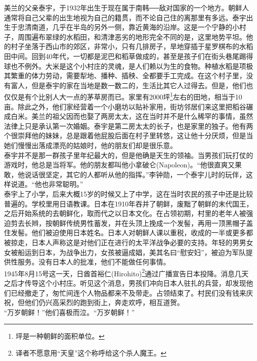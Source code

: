 \begin{multicols}{\theparacolNo}
美兰的父亲泰宇，于1932年出生于现在属于南韩──敌对国家的一个地方。朝鲜人通常将自己父辈的出生地视为自己的籍贯，而不论自己住的离那里有多远。泰宇出生于忠清南道，几乎在半岛的另外一侧，靠近黄海的沿岸。这是一个宁静的小村子，周围遍布翠绿的水稻田，和清津恶劣的地形完全不同的是，这里地势平坦。他的村子坐落于西山市的郊区，非常小，只有几排房子，旱地穿插于星罗棋布的水稻田中间。回到40年代，一切都是泥巴和稻草做成的，甚至是孩子们在街头巷尾踢得球也不例外。大米是这个小村庄的灵魂，是人们赖以为生的食物。种植水稻是项极其繁重的体力劳动，需要犁地、播种、插秧、全都要手工完成。在这个村子里，没有富人，但是泰宇的家在当地是数一数二的，生活比其它人过得去。但是，他们也仅仅是有个比别人大一点的茅草房而已。家里有2000坪\footnote{坪是一种朝鲜的面积单位。}左右的田地，相当于10亩。除此之外，他们家经营着一个小磨坊以贴补家用，街坊邻居们来这里把稻谷碾成白米。美兰的祖父因而也娶了两房太太，这在当时并不是什么稀罕的事情，虽然法律上只是承认第一次婚姻。泰宇是第二房太太的长子，也是家里的独子。他有两个很崇拜他的妹妹，总是跟着他屁股后面在村子里转悠，这让他十分厌烦，但是当她们慢慢出落成漂亮的姑娘时，他的朋友们却是很乐意。\\

泰宇并不是那一群孩子里年纪最大的，但是他确是天生的领袖。当男孩们玩打仗的游戏时，他总是当将军。他的朋友都叫他小拿破仑(Napoleon)。“他很直爽又果敢，他说话很坚定，其它的人都听从他的指挥。”李钟勋，一个泰宇儿时的玩伴，这样说道。“他也非常聪明。”\\

泰宇上了小学，后来大概15岁的时候又上了中学，这在当时农民的孩子中还是比较普遍的。学校里用日语教课。日本在1910年吞并了朝鲜，废黜了朝鲜的末代国王，之后开始系统的去朝鲜化，取而代之以日本文化。在占领初期，村里的老年人被强迫剪去长辫，按朝鲜传统男性蓄发，并在头顶上挽成一个发髻，再用一顶黑帽子盖住发髻。他们被迫使用日本姓名。日本人对朝鲜人课以重税，收成的一半或更多都被掠走，日本人声称这是对他们正在进行的太平洋战争必要的支持。年轻的男男女女被船运到日本，为战争出力，女孩被逼成娼，美其名曰“慰安妇”，被迫为军队提供性服务。没有日本人的批准，他们不能做任何事情。\\

1945年8月15号这一天，日酋首裕仁(Hirohito)\footnote{译者不愿意用“天皇”这个称呼给这个杀人魔王。}通过广播宣告日本投降。消息几天之后才传导这个小村庄。听见这个消息，男孩们冲向日本人驻扎的兵营，却发现他们已经撤走了，匆忙间连个人物品都来不及带走。占领结束了。村民们没有钱来庆祝，但他们仍兴高采烈的跑到街上，奔走欢呼，相互道贺。\\

“万岁朝鲜！”他们喜极而泣。“万岁朝鲜！”\\


\end{multicols}
